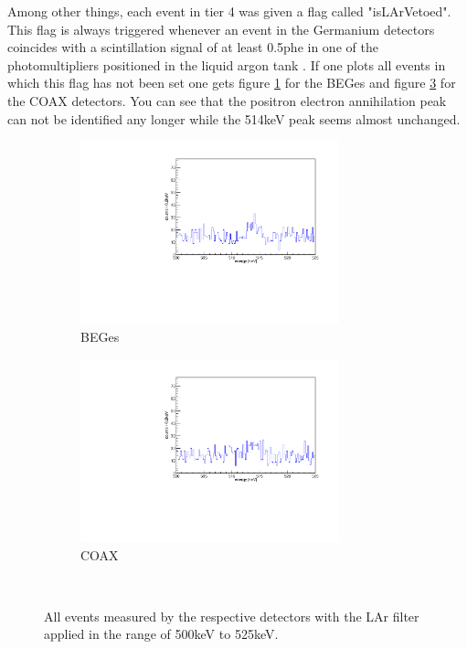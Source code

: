 Among other things, each event in tier 4 was given a flag called "isLArVetoed".
This flag is always triggered whenever an event in the Germanium detectors coincides with a scintillation signal of at least 0.5phe in one of the photomultipliers positioned in the liquid argon tank \cite{agostini_background_2017}.
If one plots all events in which this flag has not been set one gets figure \ref{fig:LArBEGes} for the BEGes and figure \ref{fig:LArCOAX} for the COAX detectors.
You can see that the positron electron annihilation peak can not be identified any longer while the 514keV peak seems almost unchanged.
\\

\begin{figure}[t!]
\centering
\begin{subfigure}{0.5\textwidth}
	\includegraphics[width=75mm]{./Bilder/500525LArVetoBEGes.pdf}
    \caption{BEGes}
  \label{fig:LArBEGes}
\end{subfigure}%
\begin{subfigure}{0.5\textwidth}
	\includegraphics[width=75mm]{./Bilder/500525LArVetoCOAX.pdf}
  \caption{COAX}
  \label{fig:LArCOAX}
\end{subfigure}
    \\
	\vspace{0.5cm}
    \caption{All events measured by the respective detectors with the LAr filter applied in the range of 500keV to 525keV.}
\end{figure}

